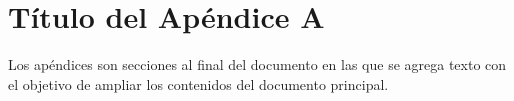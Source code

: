 \chapter{Título del Apéndice A}
\label{Appendix:Key1}

Los apéndices son secciones al final del documento en las que se agrega texto con el objetivo de ampliar los contenidos del documento principal.